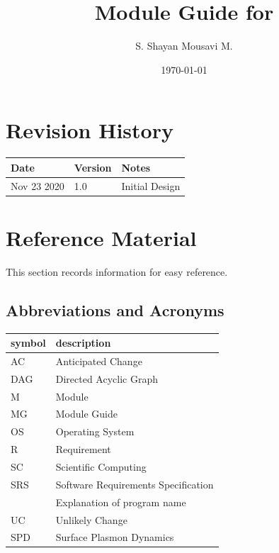 \documentclass[12pt, titlepage]{article}
\begin{document}
	
	\title{Module Guide for \progname{}} \author{S. Shayan Mousavi M.} \date{\today}
	
	\maketitle
	
	
	\section{Revision History}
	
	\begin{tabularx}{\textwidth}{p{3cm}p{2cm}X} \toprule {\bf Date} & {\bf Version}
		& {\bf Notes}\\ \midrule Nov 23 2020 & 1.0 & Initial Design\\
		
		\bottomrule \end{tabularx}
	
	\newpage
	
	\section{Reference Material}
	
	This section records information for easy reference.
	
	\subsection{Abbreviations and Acronyms}
	
	\renewcommand{\arraystretch}{1.2} \begin{tabular}{l l} \toprule \textbf{symbol}
		& \textbf{description}\\ \midrule AC & Anticipated Change\\ DAG & Directed
		Acyclic Graph \\ M & Module \\ MG & Module Guide \\ OS & Operating System \\ R &
		Requirement\\ SC & Scientific Computing \\ SRS & Software Requirements
		Specification\\ \progname & Explanation of program name\\ UC & Unlikely Change
		\\ SPD & Surface Plasmon Dynamics\\ \bottomrule \end{tabular}\\
	
\end{document}
